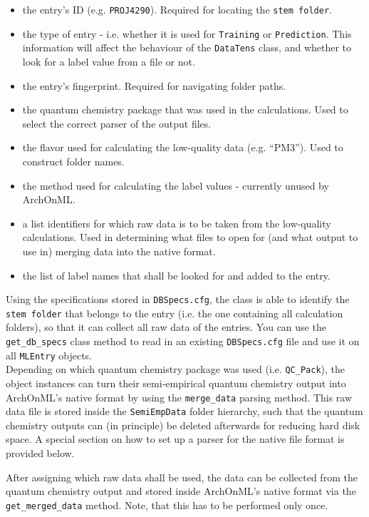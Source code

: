 \documentclass[12pt]{achemso}
\begin{document}
\begin{itemize}
    \item the entry's ID (e.g. \texttt{PROJ4290}). Required for locating the \texttt{stem folder}.
    \item the type of entry - i.e. whether it is used for \texttt{Training} or \texttt{Prediction}. This information will affect the behaviour of the \texttt{DataTens} class, and whether to look for a label value from a file or not.
    \item the entry's fingerprint. Required for navigating folder paths.
    \item the quantum chemistry package that was used in the calculations. Used to select the correct parser of the output files.
    \item the flavor used for calculating the low-quality data (e.g. ``PM3''). Used to construct folder names.
    \item the method used for calculating the label values - currently unused by ArchOnML.
    \item a list identifiers for which raw data is to be taken from the low-quality calculations. Used in determining what files to open for (and what output to use in) merging data into the native format.
    \item the list of label names that shall be looked for and added to the entry.
\end{itemize}

\noindent Using the specifications stored in \texttt{DBSpecs.cfg}, the class is able to identify the \texttt{stem folder} that belongs to the entry (i.e. the one containing all calculation folders), so that it can collect all raw data of the entries. You can use the \texttt{get\_db\_specs} class method to read in an existing \texttt{DBSpecs.cfg} file and use it on all \texttt{MLEntry} objects.\\

\noindent Depending on which quantum chemistry package was used (i.e. \texttt{QC\_Pack}), the object instances can turn their semi-empirical quantum chemistry output into ArchOnML's native format by using the \verb+merge_data+ parsing method. This raw data file is stored inside the \verb+SemiEmpData+ folder hierarchy, such that the quantum chemistry outputs can (in principle) be deleted afterwards for reducing hard disk space. A special section on how to set up a parser for the native file format is provided below.

\noindent After assigning which raw data shall be used, the data can be collected from the quantum chemistry output and stored inside ArchOnML's native format via the \verb+get_merged_data+ method. Note, that this has to be performed only once.
\end{document}
